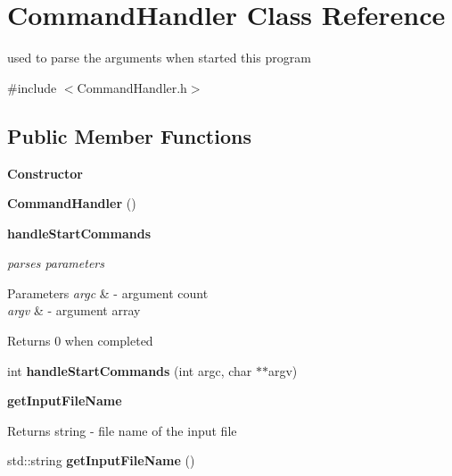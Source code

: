 \hypertarget{class_command_handler}{}\section{Command\+Handler Class Reference}
\label{class_command_handler}


used to parse the arguments when started this program  




{\ttfamily \#include $<$Command\+Handler.\+h$>$}

\subsection*{Public Member Functions}
\begin{Indent}{\bf Constructor}\par
\begin{DoxyCompactItemize}
\item 
\hypertarget{class_command_handler_a9a98482665c0a42277473c2b489ea4cb}{}{\bfseries Command\+Handler} ()\label{class_command_handler_a9a98482665c0a42277473c2b489ea4cb}

\end{DoxyCompactItemize}
\end{Indent}
\begin{Indent}{\bf handle\+Start\+Commands}\par
{\em parses parameters


\begin{DoxyParams}{Parameters}
{\em argc} & -\/ argument count \\
\hline
{\em argv} & -\/ argument array \\
\hline
\end{DoxyParams}
\begin{DoxyReturn}{Returns}
0 when completed 
\end{DoxyReturn}
}\begin{DoxyCompactItemize}
\item 
\hypertarget{class_command_handler_a74b569145388ba0274c2ce1d07a0bfa3}{}int {\bfseries handle\+Start\+Commands} (int argc, char $\ast$$\ast$argv)\label{class_command_handler_a74b569145388ba0274c2ce1d07a0bfa3}

\end{DoxyCompactItemize}
\end{Indent}
\begin{Indent}{\bf get\+Input\+File\+Name}\par
{\em \begin{DoxyReturn}{Returns}
string -\/ file name of the input file 
\end{DoxyReturn}
}\begin{DoxyCompactItemize}
\item 
\hypertarget{class_command_handler_acb568f7f04504318e5f548385ec1be9f}{}std\+::string {\bfseries get\+Input\+File\+Name} ()\label{class_command_handler_acb568f7f04504318e5f548385ec1be9f}

\end{DoxyCompactItemize}
\end{Indent}
